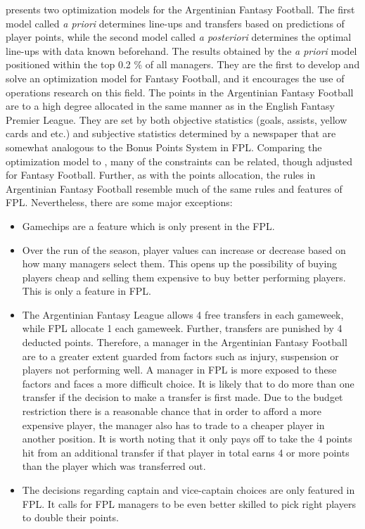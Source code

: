 \newpar

\cite{Bonomo} presents two optimization models for the Argentinian Fantasy Football. The first model called \textit{a priori} determines line-ups and transfers based on predictions of player points, while the second model called \textit{a posteriori} determines the optimal line-ups with data known beforehand. The results obtained by the \textit{a priori} model positioned within the top 0.2 \% of all managers. They are the first to develop and solve an optimization model for Fantasy Football, and it encourages the use of operations research on this field. The points in the Argentinian Fantasy Football are to a high degree allocated in the same manner as in the English Fantasy Premier League. They are set by both objective statistics (goals, assists, yellow cards and etc.) and subjective statistics determined by a newspaper that are somewhat analogous to the Bonus Points System in FPL. Comparing the optimization model to \cite{Mathsports}, many of the constraints can be related, though adjusted for Fantasy Football. Further, as with the points allocation, the rules in Argentinian Fantasy Football resemble much of the same rules and features of FPL. Nevertheless, there are some major exceptions: 


\begin{itemize}
    \item Gamechips are a feature which is only present in the FPL.  
    \item Over the run of the season, player values can increase or decrease based on how many managers select them. This opens up the possibility of buying players cheap and selling them expensive to buy better performing players. This is only a feature in FPL.
    \item The Argentinian Fantasy League allows 4 free transfers in each gameweek, while FPL allocate 1 each gameweek. Further, transfers are punished by 4 deducted points. Therefore, a manager in the Argentinian Fantasy Football are to a greater extent guarded from factors such as injury, suspension or players not performing well. A manager in FPL is more exposed to these factors and faces a more difficult choice. It is likely that to do more than one transfer if the decision to make a transfer is first made. Due to the budget restriction there is a reasonable chance that in order to afford a more expensive player, the manager also has to trade to a cheaper player in another position. It is worth noting that it only pays off to take the 4 points hit from an additional transfer if that player in total earns 4 or more points than the player which was transferred out. 
    \item The decisions regarding captain and vice-captain choices are only featured in FPL. It calls for FPL managers to be even better skilled to pick right players to double their points. 
\end{itemize}

